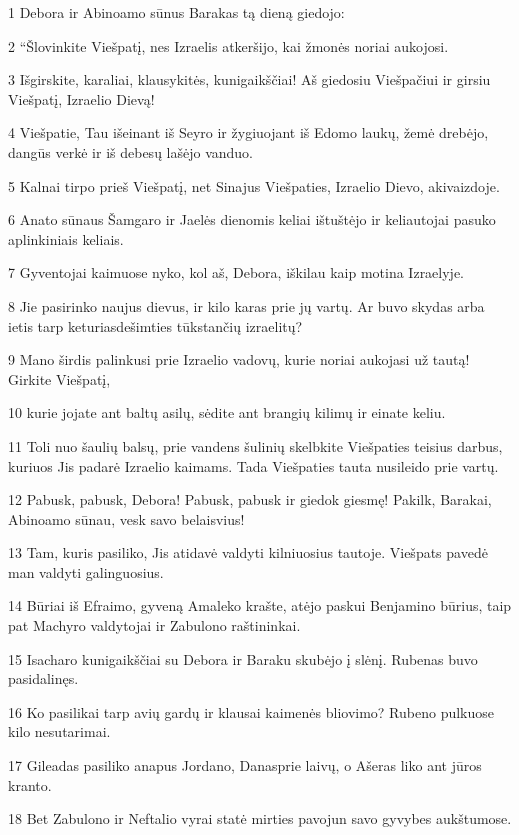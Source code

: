 \par 1 Debora ir Abinoamo sūnus Barakas tą dieną giedojo: 
\par 2 “Šlovinkite Viešpatį, nes Izraelis atkeršijo, kai žmonės noriai aukojosi. 
\par 3 Išgirskite, karaliai, klausykitės, kunigaikščiai! Aš giedosiu Viešpačiui ir girsiu Viešpatį, Izraelio Dievą! 
\par 4 Viešpatie, Tau išeinant iš Seyro ir žygiuojant iš Edomo laukų, žemė drebėjo, dangūs verkė ir iš debesų lašėjo vanduo. 
\par 5 Kalnai tirpo prieš Viešpatį, net Sinajus Viešpaties, Izraelio Dievo, akivaizdoje. 
\par 6 Anato sūnaus Šamgaro ir Jaelės dienomis keliai ištuštėjo ir keliautojai pasuko aplinkiniais keliais. 
\par 7 Gyventojai kaimuose nyko, kol aš, Debora, iškilau kaip motina Izraelyje. 
\par 8 Jie pasirinko naujus dievus, ir kilo karas prie jų vartų. Ar buvo skydas arba ietis tarp keturiasdešimties tūkstančių izraelitų? 
\par 9 Mano širdis palinkusi prie Izraelio vadovų, kurie noriai aukojasi už tautą! Girkite Viešpatį, 
\par 10 kurie jojate ant baltų asilų, sėdite ant brangių kilimų ir einate keliu. 
\par 11 Toli nuo šaulių balsų, prie vandens šulinių skelbkite Viešpaties teisius darbus, kuriuos Jis padarė Izraelio kaimams. Tada Viešpaties tauta nusileido prie vartų. 
\par 12 Pabusk, pabusk, Debora! Pabusk, pabusk ir giedok giesmę! Pakilk, Barakai, Abinoamo sūnau, vesk savo belaisvius! 
\par 13 Tam, kuris pasiliko, Jis atidavė valdyti kilniuosius tautoje. Viešpats pavedė man valdyti galinguosius. 
\par 14 Būriai iš Efraimo, gyveną Amaleko krašte, atėjo paskui Benjamino būrius, taip pat Machyro valdytojai ir Zabulono raštininkai. 
\par 15 Isacharo kunigaikščiai su Debora ir Baraku skubėjo į slėnį. Rubenas buvo pasidalinęs. 
\par 16 Ko pasilikai tarp avių gardų ir klausai kaimenės bliovimo? Rubeno pulkuose kilo nesutarimai. 
\par 17 Gileadas pasiliko anapus Jordano, Danas­prie laivų, o Ašeras liko ant jūros kranto. 
\par 18 Bet Zabulono ir Neftalio vyrai statė mirties pavojun savo gyvybes aukštumose. 
